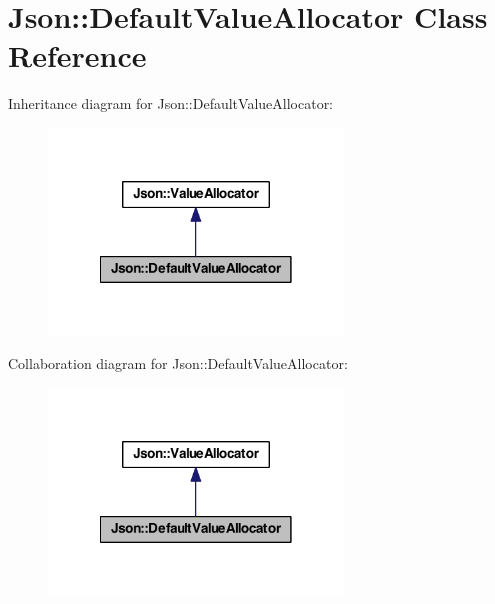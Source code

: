 \hypertarget{class_json_1_1_default_value_allocator}{\section{Json\-:\-:Default\-Value\-Allocator Class Reference}
\label{class_json_1_1_default_value_allocator}
}


Inheritance diagram for Json\-:\-:Default\-Value\-Allocator\-:
\nopagebreak
\begin{figure}[H]
\begin{center}
\leavevmode
\includegraphics[width=222pt]{class_json_1_1_default_value_allocator__inherit__graph}
\end{center}
\end{figure}


Collaboration diagram for Json\-:\-:Default\-Value\-Allocator\-:
\nopagebreak
\begin{figure}[H]
\begin{center}
\leavevmode
\includegraphics[width=222pt]{class_json_1_1_default_value_allocator__coll__graph}
\end{center}
\end{figure}
